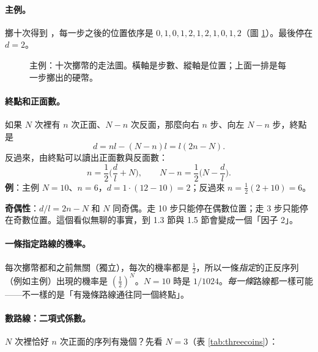 \paragraph{主例。}
擲十次得到 \coinH\coinT\coinH\coinH\coinT\coinH\coinT\coinT\coinH\coinH，每一步之後的位置依序是
$0,1,0,1,2,1,2,1,0,1,2$（圖 \ref{fig:mainwalk}）。最後停在 $d=2$。

\begin{figure}[H]
\centering
\FigMainWalk
\caption{主例：十次擲幣的走法圖。橫軸是步數、縱軸是位置；上面一排是每一步擲出的硬幣。}
\label{fig:mainwalk}
\end{figure}

\paragraph{終點和正面數。}
如果 $N$ 次裡有 $n$ 次正面、$N-n$ 次反面，那麼向右 $n$ 步、向左 $N-n$ 步，終點是
\begin{equation}
d=nl-(N-n)l=l(2n-N). \tag{1.1}
\end{equation}
反過來，由終點可以讀出正面數與反面數：
\begin{equation}
n=\frac12\Big(\frac dl+N\Big),\qquad N-n=\frac12\Big(N-\frac dl\Big). \tag{1.2--1.3}
\end{equation}
\textbf{例}：主例 $N=10$、$n=6$，$d=1\cdot(12-10)=2$；反過來 $n=\frac12(2+10)=6$。\par
\textbf{奇偶性}：$d/l=2n-N$ 和 $N$ 同奇偶。走 10 步只能停在偶數位置；走 3 步只能停在奇數位置。這個看似無聊的事實，到 1.3 節與 1.5 節會變成一個「因子 2」。

\paragraph{一條指定路線的機率。}
每次擲幣都和之前無關（獨立），每次的機率都是 $\tfrac12$，所以一條\emph{指定}的正反序列（例如主例）出現的機率是
$(\tfrac12)^N$。$N=10$ 時是 $1/1024$。\emph{每一條}路線都一樣可能——不一樣的是「有幾條路線通往同一個終點」。

\paragraph{數路線：二項式係數。}
$N$ 次裡恰好 $n$ 次正面的序列有幾個？先看 $N=3$（表 \ref{tab:threecoins}）：

\begin{table}[H]
\centering
\TabThreeCoins
\caption{$N=3$ 的全部 $2^3=8$ 個序列，依正面數分組。書上 Fig.~1.2 畫的就是第二列的三個。}
\label{tab:threecoins}
\end{table}

